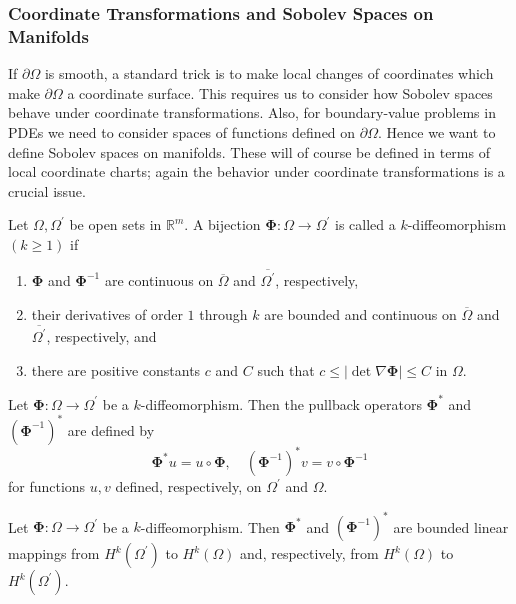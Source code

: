 \subsubsection{Coordinate Transformations and Sobolev Spaces on Manifolds}\label{subsec:sobolev-coordinate-transformations-manifolds}

If $\partial\Omega$ is smooth, a standard trick is to make local changes of coordinates which make $\partial\Omega$ a coordinate surface. This requires us to consider how Sobolev spaces behave under coordinate transformations. Also, for boundary-value problems in PDEs we need to consider spaces of functions defined on $\partial\Omega$. Hence we want to define Sobolev spaces on manifolds. These will of course be defined in terms of local coordinate charts; again the behavior under coordinate transformations is a crucial issue.

\begin{Definition}
\label{def:sobolev-k-diffeomorphism}
Let $\Omega,\Omega^{\prime}$ be open sets in $\mathbb{R}^m$. A bijection $\bm{\Phi}:\Omega\to\Omega^{\prime}$ is called a $k$-diffeomorphism $(k\geq1)$ if\begin{enumerate}
\item $\bm{\Phi}$ and $\bm{\Phi}^{-1}$ are continuous on $\overline\Omega$ and $\overline{\Omega^{\prime}}$, respectively,
\item their derivatives of order $1$ through $k$ are bounded and continuous on $\overline\Omega$ and $\overline{\Omega^{\prime}}$, respectively, and
\item there are positive constants $c$ and $C$ such that $c\leq|\det\nabla\bm{\Phi}|\leq C$ in $\Omega$.
\end{enumerate}
\end{Definition}

\begin{Definition}
\label{def:sobolev-diffeomorphism-pullbacks}
Let $\bm{\Phi}:\Omega\to\Omega^{\prime}$ be a $k$-diffeomorphism. Then the pullback operators $\bm{\Phi}^*$ and $(\bm{\Phi}^{-1})^*$ are defined by
\begin{equation}\label{eq:sobolev-diffeomorphism-pullback-definitions}
\bm{\Phi}^*u=u\circ\bm{\Phi},\quad(\bm{\Phi}^{-1})^*v=v\circ\bm{\Phi}^{-1}
\end{equation}
for functions $u,v$ defined, respectively, on $\Omega^{\prime}$ and $\Omega$.
\end{Definition}

\begin{Theorem}
\label{thm:sobolev-integer-order-pullback}
Let $\bm{\Phi}:\Omega\to\Omega^{\prime}$ be a $k$-diffeomorphism. Then $\bm{\Phi}^*$ and $(\bm{\Phi}^{-1})^*$ are bounded linear mappings from $H^k(\Omega^{\prime})$ to $H^k(\Omega)$ and, respectively, from $H^k(\Omega)$ to $H^k(\Omega^{\prime})$.
\end{Theorem}

